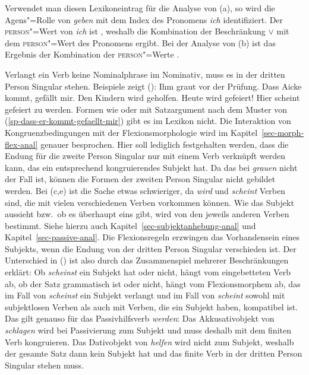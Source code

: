 \zs
Verwendet man diesen Lexikoneintrag für die Analyse von (a), so wird die Agens"=Rolle
von \emph{geben} mit dem Index des Pronomens \emph{ich} identifiziert. Der \textsc{person}"=Wert von
\emph{ich} ist , weshalb die Kombination der Beschränkung  $\vee$\!  mit dem \textsc{person}"=Wert 
des Pronomens  ergibt. Bei der Analyse von (b) ist das Ergebnis der Kombination
der \textsc{person}"=Werte .

Verlangt ein Verb keine Nominalphrase im Nominativ, muss es in der dritten Person Singular stehen.
Beispiele zeigt ():
\eal
\ex Ihm graut vor der Prüfung.
\ex\label{sp-dass-er-kommt-gefaellt-mir}
Dass Aicke kommt, gefällt mir.
\ex Den Kindern wird geholfen.
\ex Heute wird gefeiert!
\ex Hier scheint gefeiert zu werden.\label{bsp-scheint-gefeiert-zu-werden}
\zl
Formen wie  oder  mit Satzargument nach dem Muster von
(\ref{sp-dass-er-kommt-gefaellt-mir}) gibt es im Lexikon nicht. 
Die Interaktion von Kongruenzbedingungen mit der Flexionsmorphologie wird 
im Kapitel~\ref{sec-morph-flex-anal} genauer besprochen. Hier soll lediglich festgehalten werden,
dass \zb die Endung für die zweite Person Singular nur mit einem Verb verknüpft
werden kann, das ein entsprechend kongruierendes Subjekt hat. Da das bei \emph{grauen} nicht der Fall
ist, können die Formen der zweiten Person Singular nicht gebildet werden.
Bei (c,e) ist die Sache etwas schwieriger, da \emph{wird} und \emph{scheint} Verben sind,
die mit vielen verschiedenen Verben vorkommen können. Wie das Subjekt aussieht bzw.\ ob es überhaupt
eins gibt, wird von den jeweils anderen Verben bestimmt.
Siehe hierzu auch Kapitel~\ref{sec-subjektanhebung-anal} und Kapitel~\ref{sec-passive-anal}.
Die Flexionsregeln erzwingen
das Vorhandensein eines Subjekts, wenn die Endung von der dritten Person Singular verschieden
ist. Der Unterschied in () ist also durch das Zusammenspiel mehrerer Beschränkungen
erklärt: Ob \emph{scheinst} ein Subjekt hat oder nicht, hängt vom eingebetteten Verb ab,
ob der Satz grammatisch ist oder nicht, hängt vom Flexionsmorphem ab, das im Fall
von \emph{scheinst} ein Subjekt verlangt und im Fall von \emph{scheint} sowohl mit
subjektlosen Verben als auch mit Verben, die ein Subjekt haben, kompatibel ist.
\eal
{}
\zl
Das gilt genauso für das Passivhilfsverb \emph{werden}:
\eal\label{bsp-kongruenz-passiv}
\zl
Das Akkusativobjekt von \emph{schlagen} wird bei Passivierung zum
Subjekt und muss deshalb mit dem finiten Verb kongruieren. Das Dativobjekt
von \emph{helfen} wird nicht zum Subjekt, weshalb der gesamte Satz
dann kein Subjekt hat und das finite Verb in der dritten Person Singular
stehen muss.

